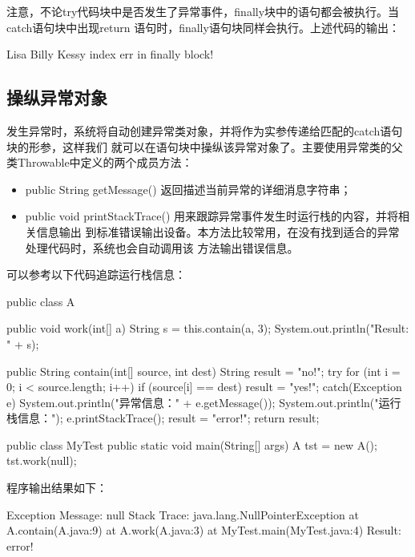 注意，不论try代码块中是否发生了异常事件，finally块中的语句都会被执行。当catch语句块中出现return
语句时，finally语句块同样会执行。上述代码的输出：

\begin{stdoutCode}
Lisa
Billy
Kessy
index err
in finally block!  
\end{stdoutCode}

\subsection{操纵异常对象}

发生异常时，系统将自动创建异常类对象，并将作为实参传递给匹配的catch语句块的形参，这样我们
就可以在语句块中操纵该异常对象了。主要使用异常类的父类Throwable中定义的两个成员方法：

\begin{itemize}
\item public String getMessage() 返回描述当前异常的详细消息字符串；
\item public void printStackTrace() 用来跟踪异常事件发生时运行栈的内容，并将相关信息输出
  到标准错误输出设备。本方法比较常用，在没有找到适合的异常处理代码时，系统也会自动调用该
  方法输出错误信息。
\end{itemize}

可以参考以下代码追踪运行栈信息：


\begin{javaCode}
public class A {
  public void work(int[] a) {
    String s = this.contain(a, 3);
    System.out.println("Result: " + s);
  }

  public String contain(int[] source, int dest) {
    String result = "no!";
    try {
      for (int i = 0; i < source.length; i++) {
        if (source[i] == dest)
        result = "yes!";
      }
    } catch(Exception e) {
      System.out.println("异常信息：" + e.getMessage());
      System.out.println("运行栈信息：");
      e.printStackTrace();
      result = "error!";
    }
    return result;
  }
}
\end{javaCode}


\begin{javaCode}
public class MyTest {
  public static void main(String[] args) {
    A tst = new A();
    tst.work(null);
  }
}
\end{javaCode}

程序输出结果如下：

\begin{stdoutCode}
Exception Message: null
Stack Trace:
java.lang.NullPointerException
    at A.contain(A.java:9)
    at A.work(A.java:3)
    at MyTest.main(MyTest.java:4)
Result: error!
\end{stdoutCode}

